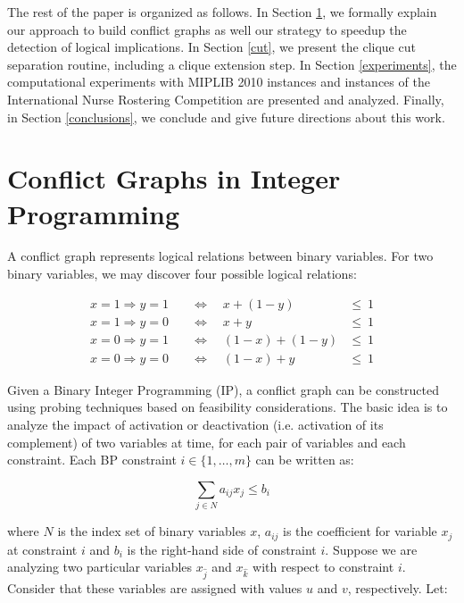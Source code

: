 \documentclass{endm}
\begin{document}
The rest of the paper is organized as follows. In Section \ref{seccgraph}, we formally explain our approach to build conflict graphs as well our strategy to speedup the detection of logical implications. In Section \ref{cut}, we present the clique cut separation routine, including a clique extension step. In Section \ref{experiments}, the computational experiments with MIPLIB 2010 instances \cite{miplib} and instances of the International Nurse Rostering Competition \cite{haspeslagh} are presented and analyzed. Finally, in Section \ref{conclusions}, we conclude and give future directions about this work.

\section{Conflict Graphs in Integer Programming}\label{seccgraph}

A conflict graph represents logical relations between binary variables. For two binary variables, we may discover four possible logical relations:

\begin{align}
x = 1 \Rightarrow y = 1 & \quad \Longleftrightarrow \quad x + (1 - y) & \leq \ 1\\
x = 1 \Rightarrow y = 0 & \quad \Longleftrightarrow \quad x + y & \leq \ 1 \\
x = 0 \Rightarrow y = 1 & \quad \Longleftrightarrow \quad (1 - x) + (1 - y) & \leq \ 1 \\
x = 0 \Rightarrow y = 0 & \quad \Longleftrightarrow \quad (1 - x) + y & \leq \ 1
\end{align}

Given a Binary Integer Programming (IP), a conflict graph can be constructed using probing techniques based on feasibility considerations. The basic idea is to analyze the impact of activation or deactivation (i.e. activation of its complement) of two variables at time, for each pair of variables and each constraint. Each BP constraint $i \in \{1,\ldots,m\}$ can be written as:

\begin{equation}
 \sum_{j \in N} a_{ij}x_{j} \leq b_{i} 
\end{equation}

\noindent where $N$ is the index set of binary variables $x$, $a_{ij}$ is the coefficient for variable $x_{j}$ at constraint $i$ and $b_{i}$ is the right-hand side of constraint $i$. Suppose we are analyzing two particular variables $x_{\hat{j}}$ and $x_{\hat{k}}$ with respect to constraint $i$. Consider that these variables are assigned with values $u$ and $v$, respectively. Let:
\end{document}
